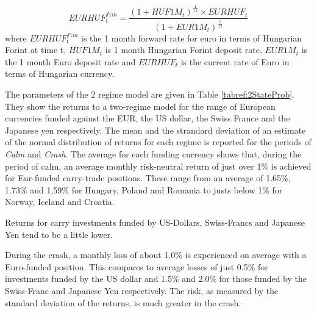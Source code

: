 \documentclass[12pt, a4paper, oneside]{article} %
\begin{document}
\begin{equation}\label{eqref:forward}
EURHUF_t^{f1m} = \frac{(1 + HUF1M_t)^{\frac{1}{12}} \times EURHUF_t }{(1 + EUR1M_t)^{\frac{1}{12}}}
\end{equation}
where  $EURHUF_t^{f1m}$ is the 1 month forward rate for euro in terms of Hungarian Forint at time t, $HUF1M_t$ is 1 month Hungarian Forint deposit rate, $EUR1M_t$ is the 1 month Euro deposit rate and $EURHUF_t$ is the current rate of Euro in terms of Hungarian currency.  


The parameters of the 2 regime model are given in Table \ref{tabref:2StateProb}.  They show the returns to a two-regime model for the range of European currencies funded against the EUR, the US dollar, the Swiss France and the Japanese yen respectively.  The mean and the strandard deviation of an estimate of the normal distribution of returns for each regime is reported for the periods of \emph{Calm} and \emph{Crash}.  The average for each funding currency shows that, during the period of calm, an average  monthly risk-neutral return of just over 1\% is achieved for Eur-funded carry-trade positions. These range from an average of 1.65\%, 1.73\% and 1,59\% for Hungary, Poland and Romania to justs below 1\% for Norway, Iceland and Croatia. 

Returns for carry investments funded by US-Dollars, Swiss-Francs and Japanese Yen tend to be a little lower. 

During the crash, a monthly loss of about 1.0\% is experienced on average with a Euro-funded position.  This compares to average losses of just 0.5\% for investments funded by the US dollar and 1.5\% and 2.0\% for those funded by the Swiss-Franc and Japanese Yen respectively. The risk, as measured by the standard deviation of the  returns, is much greater in the crash.   
\end{document}
